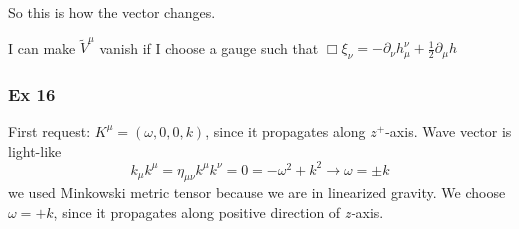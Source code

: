 So this is how the vector changes.\par
I can make $\tilde{V}^{\mu }$ vanish if I choose a gauge such that $\Box \xi _{\nu } = -\partial_{\nu }h^{\nu }_{\mu } + \frac{1}{2}\partial_{\mu  }h$

\subsubsection{Ex 16}
First request: $K^{\mu } = \left( \omega , 0,0,k \right)$, since it propagates along $z^{+}$-axis. Wave vector is light-like
\[
k_{\mu }k^{\mu } = \eta _{\mu \nu } k^{\mu }k^{\nu } = 0 = -\omega ^{2} + k^{2} \to  \omega = \pm k
\]
we used Minkowski metric tensor because we are in linearized gravity. We choose $\omega  = + k$, since it propagates along positive direction of \emph{z-}axis.\par

